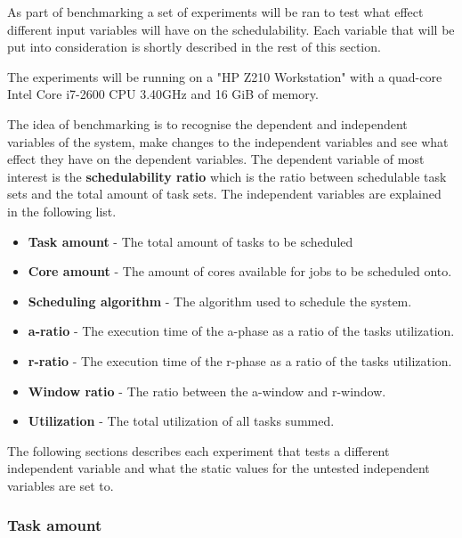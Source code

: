 \documentclass{kththesis}
\begin{document}
As part of benchmarking a set of experiments will be ran to test what effect different input
variables will have on the schedulability. Each variable that will be put into consideration is
shortly described in the rest of this section.

The experiments will be running on a "HP Z210 Workstation" with a quad-core Intel Core i7-2600 CPU
\@3.40GHz and 16 GiB of memory.

The idea of benchmarking is to recognise the dependent and independent variables of the system, make
changes to the independent variables and see what effect they have on the dependent variables. The
dependent variable of most interest is the \textbf{schedulability ratio} which is the ratio between
schedulable task sets and the total amount of task sets. The independent variables are explained in
the following list.

\begin{itemize}

    \item \textbf{Task amount} - The total amount of tasks to be scheduled
    \item \textbf{Core amount} - The amount of cores available for jobs to be scheduled onto.
    \item \textbf{Scheduling algorithm} - The algorithm used to schedule the system. 
    \item \textbf{\acrshort{a}-ratio} - The execution time of the \acrshort{a}-phase as a ratio of
        the tasks utilization.
    \item \textbf{\acrshort{r}-ratio} - The execution time of the \acrshort{r}-phase as a ratio of
        the tasks utilization.
    \item \textbf{Window ratio} - The ratio between the \acrshort{a}-window and \acrshort{r}-window.
    \item \textbf{Utilization} - The total utilization of all tasks summed.

\end{itemize}


The following sections describes each experiment that tests a different independent variable and
what the static values for the untested independent variables are set to.

\subsubsection{Task amount}
\end{document}
